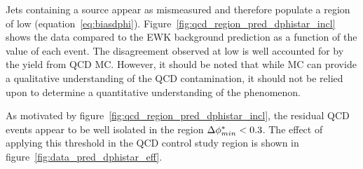 Jets containing a \met source appear as mismeasured and therefore
populate a region of low \dphistar (equation~\ref{eq:biasdphi}).
Figure~\ref{fig:qcd_region_pred_dphistar_incl} shows the data compared to the
EWK background prediction
as a function of the \mindphistar value of each event. The disagreement observed
at low \mindphistar is well accounted for by the yield from QCD MC. However, it
should be noted that while MC can provide a qualitative understanding of the QCD
contamination, it should not be relied upon to determine a quantitative
understanding of the phenomenon.

As motivated by figure~\ref{fig:qcd_region_pred_dphistar_incl}, the residual QCD
events appear to be well isolated in the region $\Delta \phi^*_{min} < 0.3$. The effect
of applying this threshold in the QCD control study region is shown in
figure~\ref{fig:data_pred_dphistar_eff}.
